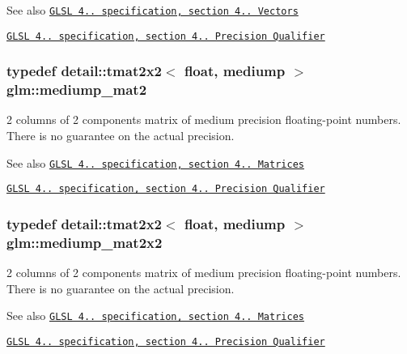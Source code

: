 \begin{DoxySeeAlso}{See also}
\href{http://www.opengl.org/registry/doc/GLSLangSpec.4.20.8.pdf}{\tt G\+L\+SL 4.. specification, section 4.. Vectors} 

\href{http://www.opengl.org/registry/doc/GLSLangSpec.4.20.8.pdf}{\tt G\+L\+SL 4.. specification, section 4.. Precision Qualifier} 
\end{DoxySeeAlso}
\subsubsection[{\texorpdfstring{mediump\+\_\+mat2}{mediump_mat2}}]{\setlength{\rightskip}{0pt plus 5cm}typedef detail\+::tmat2x2$<$ float, mediump $>$ {\bf glm\+::mediump\+\_\+mat2}}\hypertarget{group__core__precision_ga6ed8bfa67b72cea216cb558411f95f86}{}\label{group__core__precision_ga6ed8bfa67b72cea216cb558411f95f86}
2 columns of 2 components matrix of medium precision floating-\/point numbers. There is no guarantee on the actual precision.

\begin{DoxySeeAlso}{See also}
\href{http://www.opengl.org/registry/doc/GLSLangSpec.4.20.8.pdf}{\tt G\+L\+SL 4.. specification, section 4.. Matrices} 

\href{http://www.opengl.org/registry/doc/GLSLangSpec.4.20.8.pdf}{\tt G\+L\+SL 4.. specification, section 4.. Precision Qualifier} 
\end{DoxySeeAlso}
\subsubsection[{\texorpdfstring{mediump\+\_\+mat2x2}{mediump_mat2x2}}]{\setlength{\rightskip}{0pt plus 5cm}typedef detail\+::tmat2x2$<$ float, mediump $>$ {\bf glm\+::mediump\+\_\+mat2x2}}\hypertarget{group__core__precision_ga867b486aea2d228a1e1a134af73b2c4b}{}\label{group__core__precision_ga867b486aea2d228a1e1a134af73b2c4b}
2 columns of 2 components matrix of medium precision floating-\/point numbers. There is no guarantee on the actual precision.

\begin{DoxySeeAlso}{See also}
\href{http://www.opengl.org/registry/doc/GLSLangSpec.4.20.8.pdf}{\tt G\+L\+SL 4.. specification, section 4.. Matrices} 

\href{http://www.opengl.org/registry/doc/GLSLangSpec.4.20.8.pdf}{\tt G\+L\+SL 4.. specification, section 4.. Precision Qualifier} 
\end{DoxySeeAlso}
